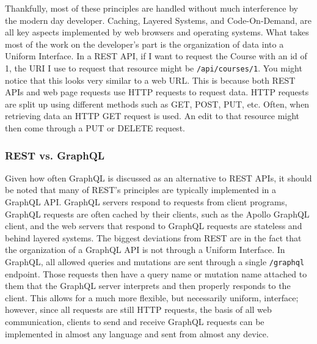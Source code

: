 Thankfully, most of these principles are handled without much interference by the modern day developer. Caching, Layered Systems, and Code-On-Demand, are all key aspects implemented by web browsers and operating systems.  What takes most of the work on the developer's part is the organization of data into a Uniform Interface. In a REST API, if I want to request the Course with an id of 1, the URI I use to request that resource might be \Verb"/api/courses/1".  You might notice that this looks very similar to a web URL.  This is because both REST APIs and web page requests use HTTP requests to request data. HTTP requests are split up using different methods such as GET, POST, PUT, etc. Often, when retrieving data an HTTP GET request is used.  An edit to that resource might then come through a PUT or DELETE request.

\subsubsection{REST vs. GraphQL}
Given how often GraphQL is discussed as an alternative to REST APIs, it should be noted that many of REST's principles are typically implemented in a GraphQL API.  GraphQL servers respond to requests from client programs, GraphQL requests are often cached by their clients, such as the Apollo GraphQL client, and the web servers that respond to GraphQL requests are stateless and behind layered systems.  The biggest deviations from REST are in the fact that the organization of a GraphQL API is not through a Uniform Interface. In GraphQL, all allowed queries and mutations are sent through a single \verb!/graphql! endpoint.  Those requests then have a query name or mutation name attached to them that the GraphQL server interprets and then properly responds to the client.  This allows for a much more flexible, but necessarily uniform, interface; however, since all requests are still HTTP requests, the basis of all web communication, clients to send and receive GraphQL requests can be implemented in almost any language and sent from almost any device.